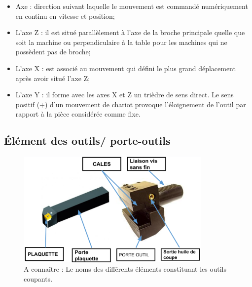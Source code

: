 \documentclass[
	11pt, %
	fleqn, %
	a4paper, %
]{LegrandOrangeBook}
\begin{document}
\begin{theorem}

    \begin{itemize}
        \item Axe : direction suivant laquelle le mouvement est commandé numériquement en continu en vitesse et position;
        \item L’axe Z : il est situé parallèlement à l’axe de la broche principale quelle que soit la machine ou perpendiculaire à la table pour les machines qui ne possèdent pas de broche;
        \item L’axe X : est associé au mouvement qui défini le plus grand déplacement après avoir situé l’axe Z;
        \item L’axe Y : il forme avec les axes X et Z un trièdre de sens direct. Le sens positif (+) d’un mouvement de chariot provoque l’éloignement de l’outil par rapport à la pièce considérée comme fixe.
    \end{itemize}
\end{theorem}


\subsection{Élément des outils/ porte-outils}

\begin{figure}[H] %
	\centering %

	\includegraphics[width=0.85\textwidth]{Images/A5.PNG} %
	\caption{A connaître : Le noms des différents éléments constituant les outils coupants.}
	\label{fig:placeholder} %

\end{figure}
\end{document}
